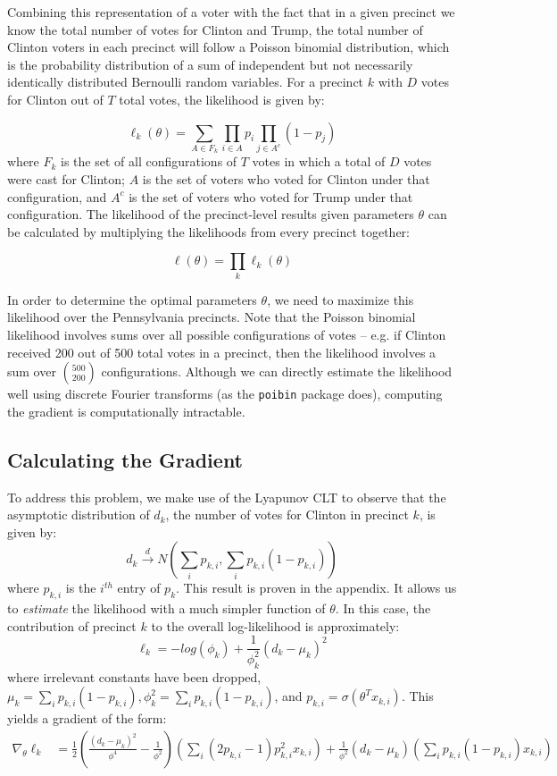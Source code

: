 \documentclass[10pt, letterpaper]{article}
\begin{document}
Combining this representation of a voter with the fact that in a given precinct we know the total number of votes for Clinton and Trump, the total number of Clinton voters in each precinct will follow a Poisson binomial distribution, which is the probability distribution of a sum of independent but not necessarily identically distributed Bernoulli random variables\cite{Poibi}. For a precinct $k$ with $D$ votes for Clinton out of $T$ total votes, the likelihood is given by:

$$\ell_k(\theta) = \sum_{A \in F_k} \prod_{i \in A} p_i \prod_{j \in A^c}(1 - p_j)$$
where $F_k$ is the set of all configurations of $T$ votes in which a total of $D$ votes were cast for Clinton; $A$ is the set of voters who voted for Clinton under that configuration, and $A^c$ is the set of voters who voted for Trump under that configuration. The likelihood of the precinct-level results given parameters $\theta$ can be calculated by multiplying the likelihoods from every precinct together:

$$\ell(\theta) = \prod_k \ell_k(\theta)$$

In order to determine the optimal parameters $\theta$, we need to maximize this likelihood over the Pennsylvania precincts. Note that the Poisson binomial likelihood involves sums over all possible configurations of votes -- e.g. if Clinton received 200 out of 500 total votes in a precinct, then the likelihood involves a sum over $500 \choose 200$ configurations. Although we can directly estimate the likelihood well using discrete Fourier transforms (as the \texttt{poibin} package does\cite{PoibiGithub}), computing the gradient is computationally intractable.

\subsection{Calculating the Gradient}

To address this problem, we make use of the Lyapunov CLT\cite{LyapunovCondition} to observe that the asymptotic distribution of $d_k$, the number of votes for Clinton in precinct $k$, is given by: 
\[ d_k \stackrel{d} \longrightarrow N \left(\sum_{i} p_{k,i}, \sum_{i} p_{k, i}(1-p_{k, i}) \right) \] 
where $p_{k, i}$ is the $i^{th}$ entry of $p_k$. This result is proven in the appendix. It allows us to \emph{estimate} the likelihood with a much simpler function of $\theta$. In this case, the contribution of precinct $k$ to the overall log-likelihood is approximately: 
\[ \ell_k = -log \left( \phi_k\right) + \frac{1}{\phi_k^2} \left( d_k -\mu_k \right)^2  \] 
where irrelevant constants have been dropped, $\mu_k =  \sum_{i} p_{k, i}(1-p_{k, i}), \phi_k^2 = \sum_{i} p_{k, i}(1-p_{k, i})$, and $p_{k, i} = \sigma(\theta^T x_{k, i})$. This yields a gradient of the form: 
\begin{align*}
\nabla_{\theta} \ell_k &=  \frac{1}{2} \left(\frac{(d_k - \mu_k)^2}{\phi^4} - \frac{1}{\phi^2} \right) \left( \sum_{i} (2 p_{k, i} - 1)p_{k, i}^2 x_{k, i} \right) + \frac{1}{\phi^2} (d_k - \mu_k) \left( \sum_i p_{k, i} (1 - p_{k, i}) x_{k, i} \right)
\end{align*}
\end{document}
